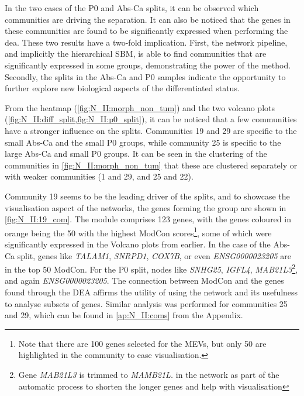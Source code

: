 In the two cases of the P0 and Abs-Ca splits, it can be observed which communities are driving the separation. It can also be noticed that the genes in these communities are found to be significantly expressed when performing the \acrlong{dea}. These two results have a two-fold implication. First, the network pipeline, and implicitly the hierarchical SBM, is able to find communities that are significantly expressed in some groups, demonstrating the power of the method. Secondly, the splits in the Abs-Ca and P0 samples indicate the opportunity to further explore new biological aspects of the differentiated status.

From the heatmap (\cref{fig:N_II:morph_non_tum}) and the two volcano plots (\cref{fig:N_II:diff_split,fig:N_II:p0_split}), it can be noticed that a few communities have a stronger influence on the splits. Communities 19 and 29 are specific to the small Abs-Ca and the small P0 groups, while community 25 is specific to the large Abs-Ca and small P0 groups. It can be seen in the clustering of the communities in \cref{fig:N_II:morph_non_tum} that these are clustered separately or with weaker communities (1 and 29, and 25 and 22).



Community 19 seems to be the leading driver of the splits, and to showcase the visualisation aspect of the networks, the genes forming the group are shown in \cref{fig:N_II:19_com}. The module comprises 123 genes, with the genes coloured in orange being the 50 with the highest ModCon scores\footnote{Note that there are 100 genes selected for the MEVs, but only 50 are highlighted in the community to ease visualisation.}, some of which were significantly expressed in the Volcano plots from earlier. In the case of the Abs-Ca split, genes like \textit{TALAM1}, \textit{SNRPD1}, \textit{COX7B}, or even \textit{ENSG0000023205} are in the top 50 ModCon. For the P0 split, nodes like \textit{SNHG25}, \textit{IGFL4}, \textit{MAB21L3}\footnote{Gene \textit{MAB21L3} is trimmed to \textit{MAMB21L.} in the network as part of the automatic process to shorten the longer genes and help with visualisation}, and again \textit{ENSG0000023205}. The connection between ModCon and the genes found through the DEA affirms the utility of using the network and its usefulness to analyse subsets of genes. Similar analysis was performed for communities 25 and 29, which can be found in \cref{ap:N_II:coms} from the Appendix.



